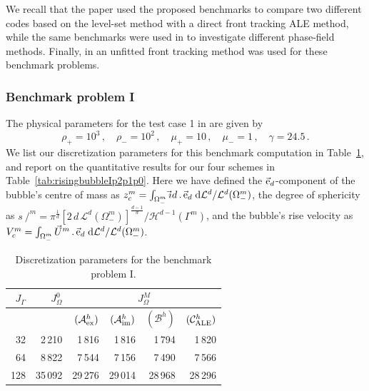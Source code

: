 \documentclass[a4paper,12pt,onecolumn]{article}
\newcommand{\vol}{\mathcal{L}^d}
\newcommand{\surfvol}{\mathcal{H}^{d-1}}
\newcommand{\dL}[1]{\;{\rm d}{\cal L}^{#1}} %
\newcommand{\id}{\rm id}
\newcommand{\strikes}{\mbox{$s\!\!\!\!\:/$}}
\newcommand{\schemeAex}{{\mathcal{A}^h_{\rm ex}}}
\newcommand{\schemeAim}{{\mathcal{A}^h_{\rm im}}}
\newcommand{\schemeB}{{\mathcal{B}^h}}
\newcommand{\schemeALE}{{\mathcal{C}^h_{\rm ALE}}}
\newcommand{\ek}{{\rm e}}
\begin{document}
We recall that the paper \cite{HysingTKPBGT09} used the proposed benchmarks to
compare two different codes based on the level-set method with a direct front
tracking ALE method, while the same benchmarks were used in \cite{AlandV12} to
investigate different phase-field methods. Finally, 
in \cite{fluidfbp} an unfitted
front tracking method was used for these benchmark problems. 

\subsubsection{Benchmark problem I}
The physical parameters for the test case 1 in \cite[Table~I]{HysingTKPBGT09}
are given by
\begin{equation} \label{eq:Hysing1}
\rho_+ = 10^3\,,\quad \rho_- = 10^2\,,\quad \mu_+ = 10\,,\quad \mu_- = 1\,,\quad
\gamma = 24.5\,.
\end{equation}
We list our discretization parameters for this benchmark computation
in Table~\ref{tab:risingbubble2Delements}, and report on the quantitative
results for our four schemes in Table~\ref{tab:risingbubbleIp2p1p0}.
Here we have defined the $\vec\ek_d$-component of the bubble's centre of mass
as $z_c^m = \int_{\Omega_-^m} \vec\id\,.\,\vec\ek_d \dL{d} / \vol(\Omega_-^m)$,
the degree of sphericity as
$\strikes^m ={\pi^{\frac{1}{d}}[2\,d\,\vol(\Omega_-^m)]^\frac{d-1}{d}}/
{\surfvol(\Gamma^m)}$, and the bubble's rise velocity as
$V^m_c = \int_{\Omega_-^m}\vec U^m\,.\,\vec\ek_d \dL{d} / \vol(\Omega_-^m)$.
\begin{table}
\center
\begin{tabular}{rrrrrr}
\hline
$J_\Gamma$ & $J_\Omega^0$ & \multicolumn{4}{c}{$J_\Omega^M$} \\ \hline
& & $(\schemeAex)$ & $(\schemeAim)$ & $(\schemeB)$ & $(\schemeALE)$ \\
\hline
 32 &  2\,210 &  1\,816 &  1\,816 &  1\,794 &  1\,820 \\
 64 &  8\,822 &  7\,544 &  7\,156 &  7\,490 &  7\,566 \\
128 & 35\,092 & 29\,276 & 29\,014 & 28\,968 & 28\,296 \\
\hline
\end{tabular}
\caption{Discretization parameters for the benchmark problem I.}
\label{tab:risingbubble2Delements}
\end{table}%
\end{document}
